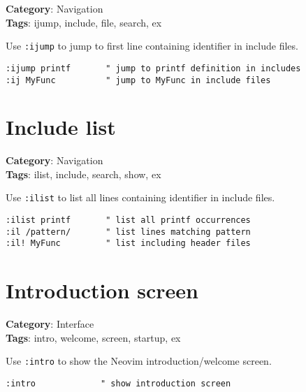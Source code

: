 {{{{{{\textbf{Category}: Navigation\\ \textbf{Tags}: ijump, include, file, search, ex
\vspace{0.5cm}

Use {\footnotesize \Verb§:ijump§} to jump to first line containing identifier in include files.

\begin{Exa*}{}
\begin{Verbatim}[fontsize=\footnotesize, breaklines, breakanywhere]
:ijump printf       " jump to printf definition in includes
:ij MyFunc          " jump to MyFunc in include files
\end{Verbatim}
\end{Exa*}

\section{Include list}

\textbf{Category}: Navigation\\ \textbf{Tags}: ilist, include, search, show, ex
\vspace{0.5cm}

Use {\footnotesize \Verb§:ilist§} to list all lines containing identifier in include files.

\begin{Exa*}{}
\begin{Verbatim}[fontsize=\footnotesize, breaklines, breakanywhere]
:ilist printf       " list all printf occurrences
:il /pattern/       " list lines matching pattern
:il! MyFunc         " list including header files
\end{Verbatim}
\end{Exa*}

\section{Introduction screen}

\textbf{Category}: Interface\\ \textbf{Tags}: intro, welcome, screen, startup, ex
\vspace{0.5cm}

Use {\footnotesize \Verb§:intro§} to show the Neovim introduction/welcome screen.

\begin{Exa*}{}
\begin{Verbatim}[fontsize=\footnotesize, breaklines, breakanywhere]
:intro             " show introduction screen
\end{Verbatim}
\end{Exa*}

}}}}}}
